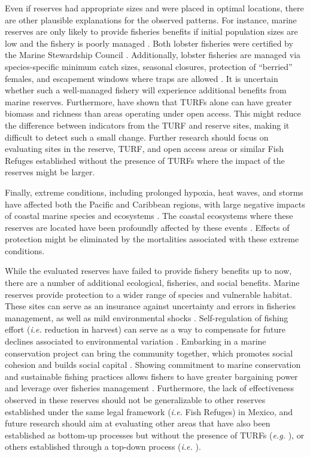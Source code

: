 \documentclass{frontiersSCNS}
\begin{document}
Even if reserves had appropriate sizes and were placed in optimal
locations, there are other plausible explanations for the observed
patterns. For instance, marine reserves are only likely to provide
fisheries benefits if initial population sizes are low and the fishery
is poorly managed \citep{hilborn_2004,hilborn_2006}. Both lobster
fisheries were certified by the Marine Stewardship Council
\citep{prezramrez_2016-J1}. Additionally, lobster fisheries are managed
via species-specific minimum catch sizes, seasonal closures, protection
of ``berried'' females, and escapement windows where traps are allowed
\citep{dof_website_1993}. It is uncertain whether such a well-managed
fishery will experience additional benefits from marine reserves.
Furthermore, \citet{gelcich_2008} have shown that TURFs alone can have
greater biomass and richness than areas operating under open access.
This might reduce the difference between indicators from the TURF and
reserve sites, making it difficult to detect such a small change.
Further research should focus on evaluating sites in the reserve, TURF,
and open access areas or similar Fish Refuges established without the
presence of TURFs where the impact of the reserves might be larger.

Finally, extreme conditions, including prolonged hypoxia, heat waves,
and storms have affected both the Pacific and Caribbean regions, with
large negative impacts of coastal marine species and ecosystems
\citep{cavole_2016,hughes_2018,breitburg_2018}. The coastal ecosystems
where these reserves are located have been profoundly affected by these
events \citep{micheli_2012-EU,woodson}. Effects of protection might be
eliminated by the mortalities associated with these extreme conditions.

While the evaluated reserves have failed to provide fishery benefits up
to now, there are a number of additional ecological, fisheries, and
social benefits. Marine reserves provide protection to a wider range of
species and vulnerable habitat. These sites can serve as an insurance
against uncertainty and errors in fisheries management, as well as mild
environmental shocks
\citep{micheli_2012-EU,deleo_2015,roberts_2017-J9,aalto}.
Self-regulation of fishing effort (\emph{i.e.} reduction in harvest) can
serve as a way to compensate for future declines associated to
environmental variation \citep{finkbeiner_2018}. Embarking in a marine
conservation project can bring the community together, which promotes
social cohesion and builds social capital \citep{fulton_2019}. Showing
commitment to marine conservation and sustainable fishing practices
allows fishers to have greater bargaining power and leverage over
fisheries management \citep{prezramrez_2012}. Furthermore, the lack of
effectiveness observed in these reserves should not be generalizable to
other reserves established under the same legal framework (\emph{i.e.}
Fish Refuges) in Mexico, and future research should aim at evaluating
other areas that have also been established as bottom-up processes but
without the presence of TURFs (\emph{e.g.} \citet{dof_websiteC_2012}),
or others established through a top-down process (\emph{i.e.}
\citet{dof_websiteU_2018}).
\end{document}
